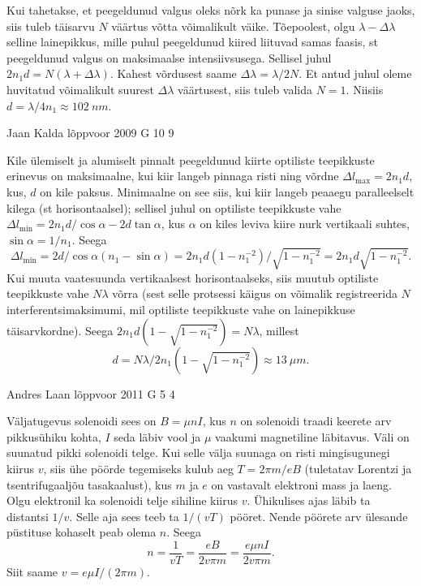 \documentclass[11pt]{article}
\begin{document}
{{Kui tahetakse, et peegeldunud valgus oleks nõrk ka punase ja sinise valguse jaoks, siis tuleb täisarvu $N$ väärtus võtta võimalikult väike. Tõepoolest, olgu $\lambda - \Delta \lambda $ selline lainepikkus, mille puhul peegeldunud kiired liituvad samas faasis, st peegeldunud valgus on maksimaalse intensiivsusega. Sellisel juhul $2n_1d = N(\lambda + \Delta \lambda )$. Kahest võrdusest saame $\Delta \lambda = \lambda /2N$. Et antud juhul oleme huvitatud võimalikult suurest $\Delta \lambda$ väärtusest, siis tuleb valida $N = 1$. Niisiis $d = \lambda /4n_1 \approx \SI{102}{nm}$.
\fi
}

{Jaan Kalda} %
{lõppvoor} %
{2009} %
{G 10} %
{9} %
{

\ifSolution
Kile ülemiselt ja alumiselt pinnalt peegeldunud kiirte optiliste teepikkuste erinevus on maksimaalne, kui
kiir langeb pinnaga risti ning võrdne $\Delta l_{\max}=2n_1d$, kus, $d$ on kile paksus. Minimaalne on see siis, kui kiir langeb peaaegu paralleelselt kilega (st horisontaalsel); sellisel juhul on optiliste teepikkuste vahe $\Delta l_{\min}=2n_1d/\cos\alpha-2d\tan\alpha$, kus $\alpha$ on kiles leviva kiire nurk vertikaali suhtes, $\sin\alpha=1/n_1$. Seega 
\[
\Delta l_{\min}=2d/\cos\alpha(n_1-\sin\alpha)=2n_1d(1-n_1^{-2})/\sqrt{1-n_1^{-2}}=2n_1d\sqrt{1-n_1^{-2}}.
\]
Kui muuta vaatesuunda vertikaalsest horisontaalseks, siis muutub optiliste teepikkuste vahe $N\lambda$ võrra (sest selle protsessi käigus on võimalik registreerida $N$ interferentsimaksimumi, mil optiliste teepikkuste vahe on lainepikkuse täisarvkordne). Seega
$2n_1d(1-\sqrt{1-n_1^{-2}})=N\lambda$, millest $$d=N\lambda/2n_1(1-\sqrt{1-n_1^{-2}})\approx \SI{13}{\mu m}.$$
\fi
}

{Andres Laan} %
{lõppvoor} %
{2011} %
{G 5} %
{4} %
{

\ifSolution
Väljatugevus solenoidi sees on $B=\mu nI$, kus $n$ on solenoidi traadi keerete arv pikkusühiku kohta, $I$ seda läbiv vool ja $\mu$ vaakumi magnetiline läbitavus. Väli on suunatud pikki solenoidi telge. Kui selle välja suunaga on risti mingisugunegi kiirus $v$, siis ühe pöörde tegemiseks kulub aeg $T=2\pi m/eB$ (tuletatav Lorentzi ja tsentrifugaaljõu tasakaalust), kus $m$ ja $e$ on vastavalt elektroni mass ja laeng. Olgu elektronil ka solenoidi telje sihiline kiirus $v$. Ühikulises ajas läbib ta distantsi $1/v$. Selle aja sees teeb ta $1/(vT)$ pööret. Nende pöörete arv ülesande püstituse kohaselt peab olema $n$. Seega
\[
n=\frac{1}{vT}=\frac{eB}{2v\pi m}=\frac{e\mu nI}{2v\pi m}.
\]
Siit saame $v=e\mu I/(2\pi m)$.

}}
\end{document}
